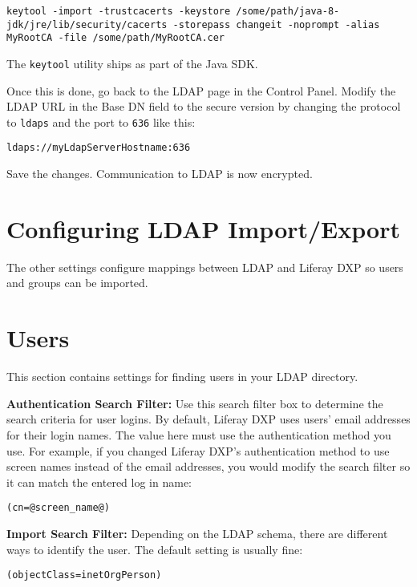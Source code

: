 \begin{verbatim}
keytool -import -trustcacerts -keystore /some/path/java-8-jdk/jre/lib/security/cacerts -storepass changeit -noprompt -alias MyRootCA -file /some/path/MyRootCA.cer
\end{verbatim}

The \texttt{keytool} utility ships as part of the Java SDK.

Once this is done, go back to the LDAP page in the Control Panel. Modify
the LDAP URL in the Base DN field to the secure version by changing the
protocol to \texttt{ldaps} and the port to \texttt{636} like this:

\begin{verbatim}
ldaps://myLdapServerHostname:636
\end{verbatim}

Save the changes. Communication to LDAP is now encrypted.

\section{Configuring LDAP
Import/Export}\label{configuring-ldap-importexport}

The other settings configure mappings between LDAP and Liferay DXP so
users and groups can be imported.

\section{Users}\label{users}

This section contains settings for finding users in your LDAP directory.

\textbf{Authentication Search Filter:} Use this search filter box to
determine the search criteria for user logins. By default, Liferay DXP
uses users' email addresses for their login names. The value here must
use the authentication method you use. For example, if you changed
Liferay DXP's authentication method to use screen names instead of the
email addresses, you would modify the search filter so it can match the
entered log in name:

\begin{verbatim}
(cn=@screen_name@)
\end{verbatim}

\textbf{Import Search Filter:} Depending on the LDAP schema, there are
different ways to identify the user. The default setting is usually
fine:

\begin{verbatim}
(objectClass=inetOrgPerson)
\end{verbatim}

